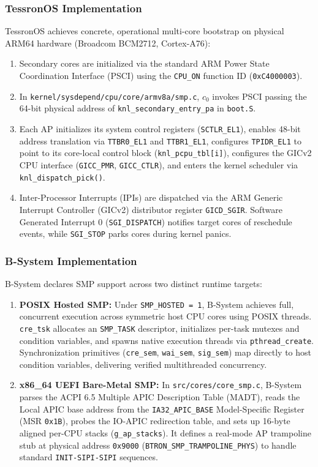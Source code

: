 \documentclass[10pt,journal,compsoc,twocolumn]{article}
\begin{document}
\subsubsection{TessronOS Implementation}
TessronOS achieves concrete, operational multi-core bootstrap on physical ARM64 hardware (Broadcom BCM2712, Cortex-A76):
\begin{enumerate}[leftmargin=*]
    \item Secondary cores are initialized via the standard ARM Power State Coordination Interface (PSCI) using the \texttt{CPU\_ON} function ID (\texttt{0xC4000003}).
    \item In \texttt{kernel/sysdepend/cpu/core/armv8a/smp.c}, $c_0$ invokes PSCI passing the 64-bit physical address of \texttt{knl\_secondary\_entry\_pa} in \texttt{boot.S}.
    \item Each AP initializes its system control registers (\texttt{SCTLR\_EL1}), enables 48-bit address translation via \texttt{TTBR0\_EL1} and \texttt{TTBR1\_EL1}, configures \texttt{TPIDR\_EL1} to point to its core-local control block (\texttt{knl\_pcpu\_tbl[i]}), configures the GICv2 CPU interface (\texttt{GICC\_PMR}, \texttt{GICC\_CTLR}), and enters the kernel scheduler via \texttt{knl\_dispatch\_pick()}.
    \item Inter-Processor Interrupts (IPIs) are dispatched via the ARM Generic Interrupt Controller (GICv2) distributor register \texttt{GICD\_SGIR}. Software Generated Interrupt 0 (\texttt{SGI\_DISPATCH}) notifies target cores of reschedule events, while \texttt{SGI\_STOP} parks cores during kernel panics.
\end{enumerate}

\subsubsection{B-System Implementation}
B-System declares SMP support across two distinct runtime targets:
\begin{enumerate}[leftmargin=*]
    \item \textbf{POSIX Hosted SMP:} Under \texttt{SMP\_HOSTED = 1}, B-System achieves full, concurrent execution across symmetric host CPU cores using POSIX threads. \texttt{cre\_tsk} allocates an \texttt{SMP\_TASK} descriptor, initializes per-task mutexes and condition variables, and spawns native execution threads via \texttt{pthread\_create}. Synchronization primitives (\texttt{cre\_sem}, \texttt{wai\_sem}, \texttt{sig\_sem}) map directly to host condition variables, delivering verified multithreaded concurrency.
    \item \textbf{x86\_64 UEFI Bare-Metal SMP:} In \texttt{src/cores/core\_smp.c}, B-System parses the ACPI 6.5 Multiple APIC Description Table (MADT), reads the Local APIC base address from the \texttt{IA32\_APIC\_BASE} Model-Specific Register (MSR \texttt{0x1B}), probes the IO-APIC redirection table, and sets up 16-byte aligned per-CPU stacks (\texttt{g\_ap\_stacks}). It defines a real-mode AP trampoline stub at physical address \texttt{0x9000} (\texttt{BTRON\_SMP\_TRAMPOLINE\_PHYS}) to handle standard \texttt{INIT-SIPI-SIPI} sequences.
\end{enumerate}
\end{document}
